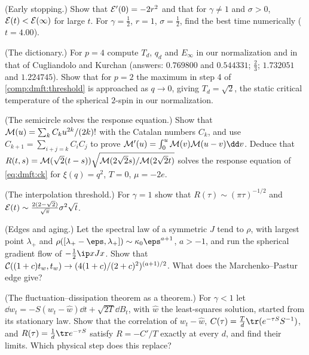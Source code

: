 \begin{refsection}
\begin{exercises}
\item \consolidation (Early stopping.) Show that $\mathcal{E}'(0)=-2r^2$ and that for $\gamma\ne1$ and $\sigma>0$, $\mathcal{E}(t)<\mathcal{E}(\infty)$ for large $t$. For $\gamma=\frac12$, $r=1$, $\sigma=\frac12$, find the best time numerically ($t=4.00$).\label{ex:dmft:early}

\item \consolidation (The dictionary.) For $p=4$ compute $T_d$, $q_d$ and $E_\infty$ in our normalization and in that of Cugliandolo and Kurchan (answers: $0.769800$ and $0.544331$; $\frac23$; $1.732051$ and $1.224745$). Show that for $p=2$ the maximum in step 4 of \cref{comp:dmft:threshold} is approached as $q\to0$, giving $T_d=\sqrt2$, the static critical temperature of the spherical $2$-spin in our normalization.\label{ex:dmft:dictionary}

\item \byhand (The semicircle solves the response equation.) Show that $\mathcal{M}(u)=\sum_kC_ku^{2k}/(2k)!$ with the Catalan numbers $C_k$, and use $C_{k+1}=\sum_{i+j=k}C_iC_j$ to prove $\dmftM'(u)=\int_0^u\dmftM(v)\dmftM(u-v)\dd v$. Deduce that $R(t,s)=\mathcal{M}(\sqrt2(t-s))\sqrt{\mathcal{M}(2\sqrt2s)/\mathcal{M}(2\sqrt2t)}$ solves the response equation of \eqref{eq:dmft:ck} for $\xi(q)=q^2$, $T=0$, $\mu=-2e$.\label{ex:dmft:catalan}

\item \byhand (The interpolation threshold.) For $\gamma=1$ show that $R(\tau)\sim(\pi\tau)^{-1/2}$ and $\mathcal{E}(t)\sim\frac{2(2-\sqrt2)}{\sqrt\pi}\sigma^2\sqrt t$. \label{ex:dmft:threshold}

\item \byhand\hard (Edges and aging.) Let the spectral law of a symmetric $J$ tend to $\rho$, with largest point $\lambda_+$ and $\rho([\lambda_+-\eps,\lambda_+])\sim\kappa_0\eps^{a+1}$, $a>-1$, and run the spherical gradient flow of $-\frac12\ip x{Jx}$. Show that $\mathcal{C}((1+c)t_w,t_w)\to(4(1+c)/(2+c)^2)^{(a+1)/2}$. What does the Marchenko--Pastur edge give? \label{ex:dmft:edges}

\item \translate (The fluctuation--dissipation theorem as a theorem.) For $\gamma<1$ let $\dd w_t=-S(w_t-\hat w)\dd t+\sqrt{2T}\dd B_t$, with $\hat w$ the least-squares solution, started from its stationary law. Show that the correlation of $w_t-\hat w$, $C(\tau)=\frac Td\tr(e^{-\tau S}S^{-1})$, and $R(\tau)=\frac1d\tr e^{-\tau S}$ satisfy $R=-C'/T$ exactly at every $d$, and find their limits. Which physical step does this replace?\label{ex:dmft:fdt}


\end{exercises}
\end{refsection}
